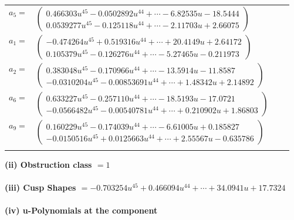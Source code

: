 \documentclass[1p]{elsarticle_modified}
\theoremstyle{definition}
\begin{document}
\begin{tabular}{m{7pt} m{180pt} m{7pt} m{180pt} }
\flushright $a_{5}=$&$\begin{pmatrix}0.466303 u^{45}-0.0502892 u^{44}+\cdots-6.82535 u-18.5444\\0.0539277 u^{45}-0.125118 u^{44}+\cdots-2.11703 u+2.66075\end{pmatrix}$ \\
\flushright $a_{1}=$&$\begin{pmatrix}-0.474264 u^{45}+0.519316 u^{44}+\cdots+20.4149 u+2.64172\\0.105379 u^{45}-0.126276 u^{44}+\cdots-5.27465 u-0.211973\end{pmatrix}$ \\
\flushright $a_{2}=$&$\begin{pmatrix}0.383048 u^{45}-0.170966 u^{44}+\cdots-13.5914 u-11.8587\\-0.0310204 u^{45}-0.00853691 u^{44}+\cdots+1.48342 u+2.14892\end{pmatrix}$ \\
\flushright $a_{6}=$&$\begin{pmatrix}0.633227 u^{45}-0.257110 u^{44}+\cdots-18.5193 u-17.0721\\-0.0566482 u^{45}-0.00540781 u^{44}+\cdots+0.210902 u+1.86803\end{pmatrix}$ \\
\flushright $a_{9}=$&$\begin{pmatrix}0.160229 u^{45}-0.174039 u^{44}+\cdots-6.61005 u+0.185827\\-0.0150516 u^{45}+0.0125663 u^{44}+\cdots+2.55567 u-0.635786\end{pmatrix}$\\&\end{tabular}
\flushleft \textbf{(ii) Obstruction class $= 1$}\\~\\
\flushleft \textbf{(iii) Cusp Shapes $= -0.703254 u^{45}+0.466094 u^{44}+\cdots+34.0941 u+17.7324$}\\~\\
\newpage\renewcommand{\arraystretch}{1}
\flushleft \textbf{(iv) u-Polynomials at the component}\newline \\
\end{document}

